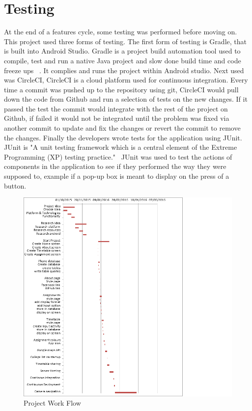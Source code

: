 \section{Testing}
At the end of a features cycle, some testing was performed before moving on. This project used three forms of testing. The first form of testing is Gradle, that is built into Android Studio. Gradle is a project build automation tool used to compile, test and run a native Java project and slow done build time and code freeze ups ~\cite{gradle}. It complies and runs the project within Android studio. Next used was CircleCI, CircleCI is a cloud platform used for continuous integration. Every time a commit was pushed up to the repository using git, CircleCI would pull down the code from Github and run a selection of tests on the new changes. If it passed the test the commit would integrate with the rest of the project on Github, if failed it would not be integrated until the problem was fixed via another commit to update and fix the changes or revert the commit to remove the changes. Finally the developers wrote tests for the application using JUnit. JUnit is "A unit testing framework which is a central element of the Extreme Programming (XP) testing practice."~\cite{junit} JUnit was used to test the actions of components in the application to see if they performed the way they were supposed to, example if a pop-up box is meant to display on the press of a button. 
\begin{figure}
	\includegraphics{img/gannt.png}
	\caption{Project Work Flow}
\end{figure}

